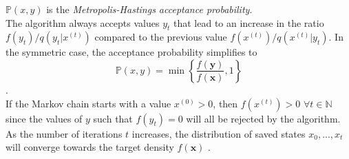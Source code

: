 $\mathbb{P}\left(x,y\right)$ is the \textit{Metropolis-Hastings acceptance probability}. \\
The algorithm always accepts values $y_t$ that lead to an increase in the ratio $f\left(y_t\right)/q\left(y_t|x^{(t)}\right)$ compared to the previous value $f\left(x^{(t)}\right)/q\left(x^{(t)}|y_t\right)$. In the symmetric case, the acceptance probability simplifies to
\begin{equation*}
     \mathbb{P}\left(x,y\right) = \min\left\lbrace\frac{f\left(\pmb{y}\right)}{f\left(\pmb{x}\right)}, 1\right\rbrace
\end{equation*}
\autocite[][]{hastings1970monte}. \\
If the Markov chain starts with a value $x^{(0)} > 0$, then $f\left(x^{(t)}\right) > 0\,\,\forall t\in\mathbb{N}$ since the values of $y$ such that $f\left(y_t\right) = 0$ will all be rejected by the algorithm. As the number of iterations $t$ increases, the distribution of saved states $x_0,...,x_t$ will converge towards the target density $f(\pmb{x})$ \autocite[][270--275]{robert2013monte}.
\clearpage
